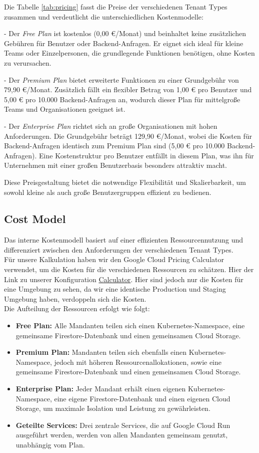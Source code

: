 Die Tabelle \ref{tab:pricing} fasst die Preise der verschiedenen Tenant Types zusammen und verdeutlicht die unterschiedlichen Kostenmodelle:

- Der \textit{Free Plan} ist kostenlos (0,00 €/Monat) und beinhaltet keine zusätzlichen Gebühren für Benutzer oder Backend-Anfragen.
Er eignet sich ideal für kleine Teams oder Einzelpersonen, die grundlegende Funktionen benötigen, ohne Kosten zu verursachen.

- Der \textit{Premium Plan} bietet erweiterte Funktionen zu einer Grundgebühr von 79,90 €/Monat.
Zusätzlich fällt ein flexibler Betrag von 1,00 € pro Benutzer und 5,00 € pro 10.000 Backend-Anfragen an, wodurch dieser Plan für mittelgroße Teams und Organisationen geeignet ist.

- Der \textit{Enterprise Plan} richtet sich an große Organisationen mit hohen Anforderungen.
Die Grundgebühr beträgt 129,90 €/Monat, wobei die Kosten für Backend-Anfragen identisch zum Premium Plan sind (5,00 € pro 10.000 Backend-Anfragen).
Eine Kostenstruktur pro Benutzer entfällt in diesem Plan, was ihn für Unternehmen mit einer großen Benutzerbasis besonders attraktiv macht.

Diese Preisgestaltung bietet die notwendige Flexibilität und Skalierbarkeit, um sowohl kleine als auch große Benutzergruppen effizient zu bedienen.

\subsection{Cost Model}
Das interne Kostenmodell basiert auf einer effizienten Ressourcennutzung und differenziert zwischen den Anforderungen der verschiedenen Tenant Types. \\
Für unsere Kalkulation haben wir den Google Cloud Pricing Calculator verwendet, um die Kosten für die verschiedenen Ressourcen zu schätzen. Hier der Link zu unserer Konfiguration \href{https://cloud.google.com/products/calculator}{Calculator}. Hier sind jedoch nur die Kosten für eine Umgebung zu sehen, da wir eine identische Production und Staging Umgebung haben, verdoppeln sich die Kosten.  \\
Die Aufteilung der Ressourcen erfolgt wie folgt:

\begin{itemize}
	\item \textbf{Free Plan:} Alle Mandanten teilen sich einen Kubernetes-Namespace, eine gemeinsame Firestore-Datenbank und einen gemeinsamen Cloud Storage.
	\item \textbf{Premium Plan:} Mandanten teilen sich ebenfalls einen Kubernetes-Namespace, jedoch mit höheren Ressourcenallokationen, sowie eine gemeinsame Firestore-Datenbank und einen gemeinsamen Cloud Storage.
	\item \textbf{Enterprise Plan:} Jeder Mandant erhält einen eigenen Kubernetes-Namespace, eine eigene Firestore-Datenbank und einen eigenen Cloud Storage, um maximale Isolation und Leistung zu gewährleisten.
	\item \textbf{Geteilte Services:} Drei zentrale Services, die auf Google Cloud Run ausgeführt werden, werden von allen Mandanten gemeinsam genutzt, unabhängig vom Plan.
\end{itemize}

